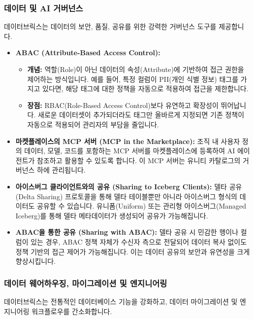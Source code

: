 \documentclass[11pt,a4paper]{article}
\begin{document}
\subsubsection{데이터 및 AI 거버넌스}
데이터브릭스는 데이터의 보안, 품질, 공유를 위한 강력한 거버넌스 도구를 제공합니다.

\begin{itemize}
    \item \textbf{ABAC (Attribute-Based Access Control):}
    \begin{itemize}
        \item \textbf{개념:} 역할(Role)이 아닌 데이터의 속성(Attribute)에 기반하여 접근 권한을 제어하는 방식입니다. 예를 들어, 특정 컬럼이 PII(개인 식별 정보) 태그를 가지고 있다면, 해당 태그에 대한 정책을 자동으로 적용하여 접근을 제한합니다.
        \item \textbf{장점:} RBAC(Role-Based Access Control)보다 유연하고 확장성이 뛰어납니다. 새로운 데이터셋이 추가되더라도 태그만 올바르게 지정되면 기존 정책이 자동으로 적용되어 관리자의 부담을 줄입니다.
    \end{itemize}
    \item \textbf{마켓플레이스의 MCP 서버 (MCP in the Marketplace):} 조직 내 사용자 정의 데이터, 모델, 코드를 포함하는 MCP 서버를 마켓플레이스에 등록하여 AI 에이전트가 참조하고 활용할 수 있도록 합니다. 이 MCP 서버는 유니티 카탈로그의 거버넌스 하에 관리됩니다.
    \item \textbf{아이스버그 클라이언트와의 공유 (Sharing to Iceberg Clients):} 델타 공유(Delta Sharing) 프로토콜을 통해 델타 테이블뿐만 아니라 아이스버그 형식의 데이터도 공유할 수 있습니다. 유니폼(Uniform) 또는 관리형 아이스버그(Managed Iceberg)를 통해 델타 메타데이터가 생성되어 공유가 가능해집니다.
    \item \textbf{ABAC을 통한 공유 (Sharing with ABAC):} 델타 공유 시 민감한 행이나 컬럼이 있는 경우, ABAC 정책 자체가 수신자 측으로 전달되어 데이터 복사 없이도 정책 기반의 접근 제어가 가능해집니다. 이는 데이터 공유의 보안과 유연성을 크게 향상시킵니다.
\end{itemize}

\subsubsection{데이터 웨어하우징, 마이그레이션 및 엔지니어링}
데이터브릭스는 전통적인 데이터베이스 기능을 강화하고, 데이터 마이그레이션 및 엔지니어링 워크플로우를 간소화합니다.
\end{document}
